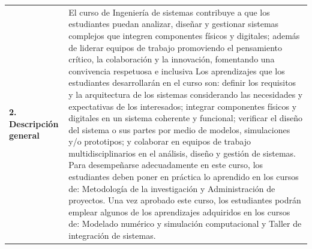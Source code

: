 \documentclass[letterpaper]{article}%
\begin{document}
\begin{tabularx}{\textwidth}{p{3cm}p{13cm}}%
\par\fontsize{12}{14}\selectfont \textbf{\textcolor{parte}{2. Descripción general}}&El curso de Ingeniería de sistemas contribuye a que los estudiantes puedan analizar, diseñar y gestionar sistemas complejos que integren componentes físicos y digitales; además de liderar equipos de trabajo promoviendo el pensamiento crítico, la colaboración y la innovación, fomentando una convivencia respetuosa e inclusiva
\newline%
\newline%
Los aprendizajes que los estudiantes desarrollarán en el curso son: definir los requisitos y la arquitectura de los sistemas considerando las necesidades y expectativas de los interesados; integrar componentes físicos y digitales en un sistema coherente y funcional; verificar el diseño del sistema o sus partes por medio de modelos, simulaciones y/o prototipos; y colaborar en equipos de trabajo multidisciplinarios en el análisis, diseño y gestión de sistemas.
\newline%
\newline%
Para desempeñarse adecuadamente en este curso, los estudiantes deben poner en práctica lo aprendido en los cursos de: Metodología de la investigación y Administración de proyectos.
\newline%
\newline%
Una vez aprobado este curso, los estudiantes podrán emplear algunos de los aprendizajes adquiridos en los cursos de: Modelado numérico y simulación computacional y Taller de integración de sistemas.
\newline%
\newline%
\\%
\end{tabularx}%
\vspace*{4mm}%
\newline%
\end{document}
